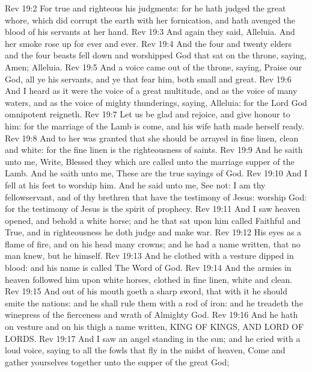\vs Rev 19:2 For true and righteous  his judgments: for he hath judged the great whore, which did corrupt the earth with her fornication, and hath avenged the blood of his servants at her hand.
\vs Rev 19:3 And again they said, Alleluia. And her smoke rose up for ever and ever.
\vs Rev 19:4 And the four and twenty elders and the four beasts fell down and worshipped God that sat on the throne, saying, Amen; Alleluia.
\vs Rev 19:5 And a voice came out of the throne, saying, Praise our God, all ye his servants, and ye that fear him, both small and great.
\vs Rev 19:6 And I heard as it were the voice of a great multitude, and as the voice of many waters, and as the voice of mighty thunderings, saying, Alleluia: for the Lord God omnipotent reigneth.
\vs Rev 19:7 Let us be glad and rejoice, and give honour to him: for the marriage of the Lamb is come, and his wife hath made herself ready.
\vs Rev 19:8 And to her was granted that she should be arrayed in fine linen, clean and white: for the fine linen is the righteousness of saints.
\vs Rev 19:9 And he saith unto me, Write, Blessed  they which are called unto the marriage supper of the Lamb. And he saith unto me, These are the true sayings of God.
\vs Rev 19:10 And I fell at his feet to worship him. And he said unto me, See  not: I am thy fellowservant, and of thy brethren that have the testimony of Jesus: worship God: for the testimony of Jesus is the spirit of prophecy.
\vs Rev 19:11 And I saw heaven opened, and behold a white horse; and he that sat upon him  called Faithful and True, and in righteousness he doth judge and make war.
\vs Rev 19:12 His eyes  as a flame of fire, and on his head  many crowns; and he had a name written, that no man knew, but he himself.
\vs Rev 19:13 And he  clothed with a vesture dipped in blood: and his name is called The Word of God.
\vs Rev 19:14 And the armies  in heaven followed him upon white horses, clothed in fine linen, white and clean.
\vs Rev 19:15 And out of his mouth goeth a sharp sword, that with it he should smite the nations: and he shall rule them with a rod of iron: and he treadeth the winepress of the fierceness and wrath of Almighty God.
\vs Rev 19:16 And he hath on  vesture and on his thigh a name written, KING OF KINGS, AND LORD OF LORDS.
\vs Rev 19:17 And I saw an angel standing in the sun; and he cried with a loud voice, saying to all the fowls that fly in the midst of heaven, Come and gather yourselves together unto the supper of the great God;
